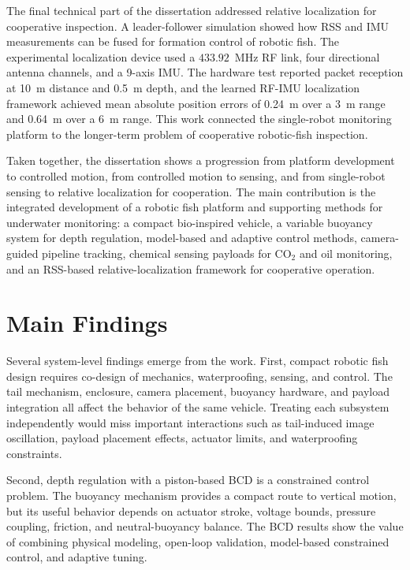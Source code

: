 \documentclass{uhcoethesis}
\begin{document}
The final technical part of the dissertation addressed relative localization for cooperative inspection. A leader-follower simulation showed how RSS and IMU measurements can be fused for formation control of robotic fish. The experimental localization device used a $433.92$~MHz RF link, four directional antenna channels, and a 9-axis IMU. The hardware test reported packet reception at 10~m distance and 0.5~m depth, and the learned RF-IMU localization framework achieved mean absolute position errors of 0.24~m over a 3~m range and 0.64~m over a 6~m range. This work connected the single-robot monitoring platform to the longer-term problem of cooperative robotic-fish inspection.

Taken together, the dissertation shows a progression from platform development to controlled motion, from controlled motion to sensing, and from single-robot sensing to relative localization for cooperation. The main contribution is the integrated development of a robotic fish platform and supporting methods for underwater monitoring: a compact bio-inspired vehicle, a variable buoyancy system for depth regulation, model-based and adaptive control methods, camera-guided pipeline tracking, chemical sensing payloads for \mbox{CO$_2$} and oil monitoring, and an RSS-based relative-localization framework for cooperative operation.

\section{Main Findings}

Several system-level findings emerge from the work. First, compact robotic fish design requires co-design of mechanics, waterproofing, sensing, and control. The tail mechanism, enclosure, camera placement, buoyancy hardware, and payload integration all affect the behavior of the same vehicle. Treating each subsystem independently would miss important interactions such as tail-induced image oscillation, payload placement effects, actuator limits, and waterproofing constraints.

Second, depth regulation with a piston-based BCD is a constrained control problem. The buoyancy mechanism provides a compact route to vertical motion, but its useful behavior depends on actuator stroke, voltage bounds, pressure coupling, friction, and neutral-buoyancy balance. The BCD results show the value of combining physical modeling, open-loop validation, model-based constrained control, and adaptive tuning.
\end{document}
